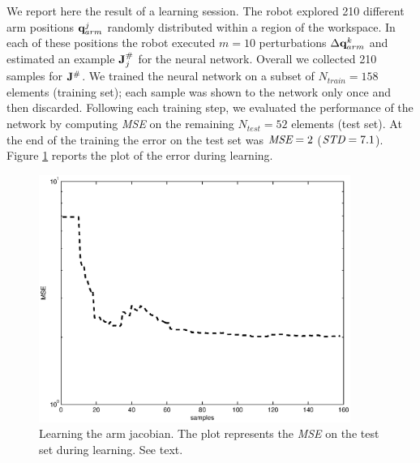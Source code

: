 We report here the result of a learning session. The robot explored 210 
different arm positions $\mathbf q_{arm}^j$ randomly distributed within a region of 
the workspace. In each of these positions the robot executed $m=10$ 
perturbations $\Delta \mathbf {q}_{arm}^k$ and estimated an example $\mathbf J^\#_j$ for 
the neural network. Overall we collected 210 samples for $\mathbf J^\#$. 
We trained the neural network on a subset of $N_{train}=158$ elements 
(training set); each 
sample was shown to the network only once and then discarded. Following each 
training step, we evaluated the performance of the network by computing 
\emph{MSE} on the remaining $N_{test}=52$ elements 
(test set). At the 
end of the training the error on the test set was $\emph{MSE}=2$ 
($\emph{STD}=7.1$). Figure \ref{fig:jacobian-error} reports the plot of 
the error during learning.
%
\begin{figure}[tbp]
\centerline{
\includegraphics[width=4.0in, angle=0 ]{./Figure/jacobian-error.eps}
} \caption{Learning the arm jacobian. The plot represents the \emph{MSE} on 
the test set during learning. See text.} \label{fig:jacobian-error}
\end{figure}
%



